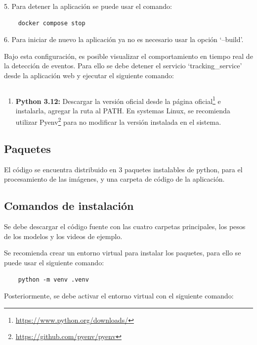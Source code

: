 \documentclass[11pt,a4paper]{article}
\begin{document}
5. Para detener la aplicación se puede usar el comando:

\begin{verbatim}
    docker compose stop
\end{verbatim}

6. Para iniciar de nuevo la aplicación ya no es necesario usar la opción `--build'.

Bajo esta configuración, es posible visualizar el comportamiento en tiempo real de la detección de eventos. Para ello se debe detener el servicio `tracking\_service' desde la aplicación web y ejecutar el siguiente comando:

\begin{verbatim}

\end{verbatim}

\begin{enumerate}
    \item \textbf{Python 3.12:} Descargar la versión oficial desde la página oficial\footnote{\url{https://www.python.org/downloads/}} e instalarla, agregar la ruta al PATH. En systemas Linux, se recomienda utilizar Pyenv\footnote{\url{https://github.com/pyenv/pyenv}} para no modificar la versión instalada en el sistema.
\end{enumerate}

\subsection{Paquetes}

El código se encuentra distribuido en 3 paquetes instalables de python, para el procesamiento de las imágenes, y una carpeta de código de la aplicación.

\subsection{Comandos de instalación}

Se debe descargar el código fuente con las cuatro carpetas principales, los pesos de los modelos y los videos de ejemplo.

Se recomienda crear un entorno virtual para instalar los paquetes, para ello se puede usar el siguiente comando:

\begin{verbatim}
    python -m venv .venv
\end{verbatim}

Posteriormente, se debe activar el entorno virtual con el siguiente comando:
\end{document}
